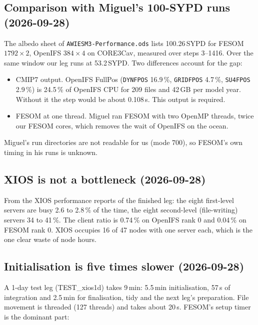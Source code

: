 \documentclass[11pt,a4paper]{article}
\begin{document}
\subsection{Comparison with Miguel's 100-SYPD runs (2026-09-28)}
The albedo sheet of \texttt{AWIESM3-Performance.ods} lists 100.26\,SYPD for FESOM $1792\times2$, OpenIFS $384\times4$ on CORE3Cav, measured over steps 3--1416. Over the same window our leg runs at 53.2\,SYPD. Two differences account for the gap:
\begin{itemize}
\item CMIP7 output. OpenIFS FullPos (\texttt{DYNFPOS} 16.9\,\%, \texttt{GRIDFPOS} 4.7\,\%, \texttt{SU4FPOS} 2.9\,\%) is 24.5\,\% of OpenIFS CPU for 209 files and 42\,GB per model year. Without it the step would be about 0.108\,s. This output is required.
\item FESOM at one thread. Miguel ran FESOM with two OpenMP threads, twice our FESOM cores, which removes the wait of OpenIFS on the ocean.
\end{itemize}
Miguel's run directories are not readable for us (mode 700), so FESOM's own timing in his runs is unknown.

\subsection{XIOS is not a bottleneck (2026-09-28)}
From the XIOS performance reports of the finished leg: the eight first-level servers are busy 2.6 to 2.8\,\% of the time, the eight second-level (file-writing) servers 34 to 41\,\%. The client ratio is 0.74\,\% on OpenIFS rank 0 and 0.04\,\% on FESOM rank 0. XIOS occupies 16 of 47 nodes with one server each, which is the one clear waste of node hours.

\subsection{Initialisation is five times slower (2026-09-28)}
A 1-day test leg (TEST\_xios1d) takes 9\,min: 5.5\,min initialisation, 57\,s of integration and 2.5\,min for finalisation, tidy and the next leg's preparation. File movement is threaded (127 threads) and takes about 20\,s. FESOM's setup timer is the dominant part:
\end{document}
